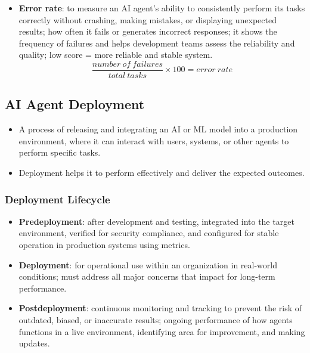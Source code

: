 \documentclass[12pt, letterpaper]{article}
\begin{document}
\begin{itemize}
\begin{itemize}
\begin{itemize}
\begin{equation}
                        \end{equation}
                    \item \textbf{Error rate}: to measure an AI agent's ability to consistently perform its tasks correctly without crashing, making mistakes, or displaying unexpected results; how often it fails or generates incorrect responses; it shows the frequency of failures and helps development teams assess the reliability and quality; low score = more reliable and stable system.
                        \begin{equation}
                            \frac{number\ of\ failures}{total\ tasks} \times 100 = error\ rate
                        \end{equation}
                \end{itemize}
        \end{itemize}
\end{itemize}

\subsection{AI Agent Deployment}
\begin{itemize}
    \item A process of releasing and integrating an AI or ML model into a production environment, where it can interact with users, systems, or other agents to perform specific tasks.
    \item Deployment helps it to perform effectively and deliver the expected outcomes.
\end{itemize}

\subsubsection{Deployment Lifecycle}
\begin{itemize}
    \item \textbf{Predeployment}: after development and testing, integrated into the target environment, verified for security compliance, and configured for stable operation in production systems using metrics.
    \item \textbf{Deployment}: for operational use within an organization in real-world conditions; must address all major concerns that impact for long-term performance.
    \item \textbf{Postdeployment}: continuous monitoring and tracking to prevent the risk of outdated, biased, or inaccurate results; ongoing performance of how agents functions in a live environment, identifying area for improvement, and making updates.
\end{itemize}
\end{document}
